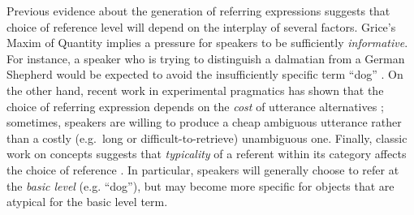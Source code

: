 \documentclass[10pt,letterpaper]{article}
\newcommand{\red}[1]{\textcolor{Red}{#1}}
\newcommand{\caroline}[1]{\textcolor{Red}{#1}}
\begin{document}
Previous evidence about the generation of referring expressions suggests that choice of reference level will depend on the interplay of several factors. 
Grice's Maxim of Quantity \cite{grice1975} implies a pressure for speakers to be sufficiently \emph{informative}.
For instance, a speaker who is trying to distinguish a dalmatian from a German Shepherd  would be expected to avoid the insufficiently specific term ``dog'' \cite{brennan1996}.
On the other hand, recent work in experimental pragmatics has shown that the choice of referring expression depends on the \emph{cost} of utterance alternatives \cite{rohde2012, degenfrankejaeger2013}; sometimes, speakers are willing to produce a cheap ambiguous utterance rather than a costly (e.g.~long or difficult-to-retrieve) unambiguous one. 
Finally, classic work on concepts suggests that \emph{typicality} of a referent within its category affects the choice of reference \cite{RoschEtAl76_BasicLevel}. In particular, speakers will generally choose to refer at the \emph{basic level} (e.g. ``dog''), but may become more specific for objects that are atypical for the basic level term.



%
%
\end{document}
